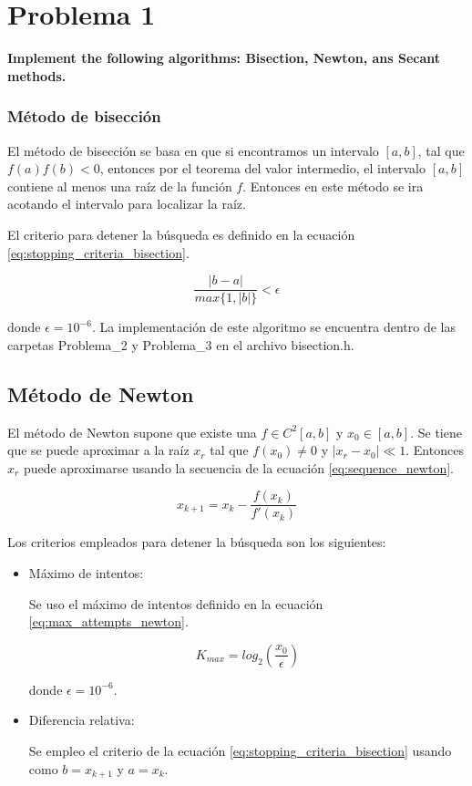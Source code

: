 \section*{Problema 1}
\textbf{Implement the following algorithms: Bisection, Newton, ans Secant methods.}
\subsubsection*{Método de bisección}

El método de bisección se basa en que si encontramos un intervalo $[a,b]$, tal que $f(a)f(b)<0$, entonces por el teorema del valor intermedio, el intervalo $[a,b]$ contiene al menos una raíz de  la función $f$. Entonces en este método se ira acotando el intervalo para localizar la raíz.

El criterio para detener la búsqueda es definido en la ecuación \ref{eq:stopping_criteria_bisection}.

\begin{equation}
    \frac{|b-a|}{max\{1,|b|\}} < \epsilon
    \label{eq:stopping_criteria_bisection}
\end{equation}

donde $\epsilon=10^{-6}$.
La implementación de este algoritmo se encuentra dentro de las carpetas \textcolor{citecolor}{Problema\_2} y \textcolor{citecolor}{Problema\_3} en el archivo \textcolor{title}{bisection.h}.

\subsection*{Método de Newton}

El método de Newton supone que existe una $f\in C^2[a,b]$ y $x_0\in [a,b]$. Se tiene que se puede aproximar a la raíz $x_r$ tal que $f(x_0)\neq 0$ y $|x_r-x_0|\ll 1$. Entonces $x_r$ puede aproximarse usando la secuencia de la ecuación \ref{eq:sequence_newton}.

\begin{equation}
    x_{k+1} = x_k - \frac{f(x_k)}{f'(x_{k})}
    \label{eq:sequence_newton}
\end{equation}

Los criterios empleados para detener la búsqueda son los siguientes:
\begin{itemize}
    \item Máximo de intentos:

          Se uso el máximo de intentos definido en la ecuación \ref{eq:max_attempts_newton}.

          \begin{equation}
              K_{max} = log_2 \left(\frac{x_0}{\epsilon}\right)
              \label{eq:max_attempts_newton}
          \end{equation}

          donde $\epsilon=10^{-6}$.

    \item Diferencia relativa:

          Se empleo el criterio de la ecuación \ref{eq:stopping_criteria_bisection} usando como $b=x_{k+1}$ y $a=x_{k}$.
\end{itemize}

